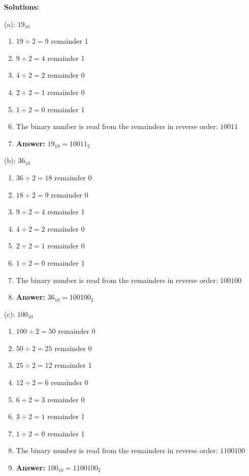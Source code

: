 \documentclass{article}
\begin{document}
\vspace*{0.5cm}

\noindent \textbf{Solutions:}

\vspace*{0.25cm}

\noindent (a): $19_{10}$

\begin{enumerate}
    \item $19 \div 2 = 9$ remainder 1
    \item $9 \div 2 = 4$ remainder 1
    \item $4 \div 2 = 2$ remainder 0
    \item $2 \div 2 = 1$ remainder 0
    \item $1 \div 2 = 0$ remainder 1
    \item The binary number is read from the remainders in reverse order: $10011$
    \item \textbf{Answer:} $19_{10} = 10011_2$
\end{enumerate}

\vspace*{0.5cm}

\noindent (b): $36_{10}$

\begin{enumerate}
    \item $36 \div 2 = 18$ remainder 0
    \item $18 \div 2 = 9$ remainder 0
    \item $9 \div 2 = 4$ remainder 1
    \item $4 \div 2 = 2$ remainder 0
    \item $2 \div 2 = 1$ remainder 0
    \item $1 \div 2 = 0$ remainder 1
    \item The binary number is read from the remainders in reverse order: $100100$
    \item \textbf{Answer:} $36_{10} = 100100_2$
\end{enumerate}

\vspace*{0.5cm}

\noindent (c): $100_{10}$

\begin{enumerate}
    \item $100 \div 2 = 50$ remainder 0
    \item $50 \div 2 = 25$ remainder 0
    \item $25 \div 2 = 12$ remainder 1
    \item $12 \div 2 = 6$ remainder 0
    \item $6 \div 2 = 3$ remainder 0
    \item $3 \div 2 = 1$ remainder 1
    \item $1 \div 2 = 0$ remainder 1
    \item The binary number is read from the remainders in reverse order: $1100100$
    \item \textbf{Answer:} $100_{10} = 1100100_2$
\end{enumerate}
\end{document}
